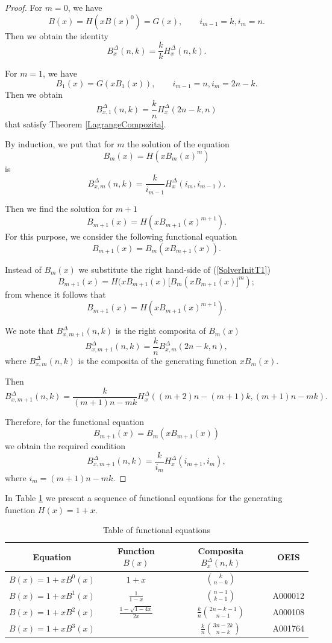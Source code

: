 \documentclass[12pt]{article}
\begin{document}
\begin{proof}
For $m=0$, we have
$$
B(x)=H(xB(x)^0)=G(x), \qquad i_{m-1}=k, i_m=n.
$$
Then we obtain the identity
$$B_x^{\Delta}(n,k)=\frac{k}{k}H_x^{\Delta}(n,k).$$

For $m=1$, we have
$$
B_1(x)=G(xB_1(x)), \qquad i_{m-1}=n, i_m=2n-k.
$$
Then we obtain
$$B_{x, 1}^{\Delta}(n,k)=\frac{k}{n}H_x^{\Delta}(2n-k,n)$$
that satisfy Theorem \ref{LagrangeCompozita}.

By induction, we put that for $m$ the solution of the equation
\begin{equation}\label{SolverInitT1}
B_m(x)=H(xB_m(x)^m)
\end{equation}
is
$$
B_{x, m}^{\Delta}(n,k)=\frac{k}{i_{m-1}}H_x^{\Delta}(i_m,i_{m-1}).
$$

Then we find the solution for $m+1$
$$
B_{m+1}(x)=H(xB_{m+1}(x)^{m+1}).
$$
For this purpose, we consider the following functional equation
$$
B_{m+1}(x)=B_m(xB_{m+1}(x)).
$$

Instead of $B_m(x)$ we substitute the right hand-side of (\ref{SolverInitT1})
$$
B_{m+1}(x)=H(xB_{m+1}(x)[B_m(xB_{m+1}(x)]^m);
$$
from whence it follows that
$$
B_{m+1}(x)=H(xB_{m+1}(x)^{m+1}).
$$

We note that $B_{x, m+1}^{\Delta}(n,k)$ is the right composita of $B_m(x)$
$$
B_{x, m+1}^{\Delta}(n,k)=\frac{k}{n}B_{x, m}^{\Delta}(2n-k,n),
$$
where $B_{x, m}^{\Delta}(n,k)$ is the composita of the generating function $xB_m(x)$.

Then
$$
B_{x, m+1}^{\Delta}(n,k)=\frac{k}{(m+1)n-mk}H_x^{\Delta}((m+2)n-(m+1)k, (m+1)n-mk).
$$

Therefore, for  the functional equation
$$
B_{m+1}(x)=B_m(xB_{m+1}(x))
$$
we obtain the required condition
$$
B_{x, m+1}^{\Delta}(n,k)=\frac{k}{i_{m}}H_x^{\Delta}(i_{m+1},i_{m}),
$$
where $i_m=(m+1)n-mk$.
\end{proof}


In Table \ref{tablepascal} we present a sequence of functional equations for the generating function $H(x)=1+x$.

\begin{table}
\begin{center}\begin{tabular}{|c|c|c|c|} \hline
Equation & Function $B(x)$ & Composita $B_{x}^{\Delta}(n,k)$ & OEIS\\  \hline
$B(x)=1+xB^0(x)$ & $1+x$ & ${k \choose n-k}$& \\ \hline
$B(x)=1+xB^1(x)$ & $\frac{1}{1-x}$ & ${n-1 \choose k-1}$ & A000012\\ \hline
$B(x)=1+xB^2(x)$ & $\frac{1-\sqrt{1-4x}}{2x} $ &$\frac{k}{n}{2n-k-1 \choose n-1}$ & A000108 \\ \hline
$B(x)=1+xB^3(x)$ & & $\frac{k}{n}{3n-2k \choose n-k}$& A001764\\ \hline
\end{tabular}
\caption{Table of functional equations}\label{tablepascal}
\end{center}
\end{table}
\end{document}
